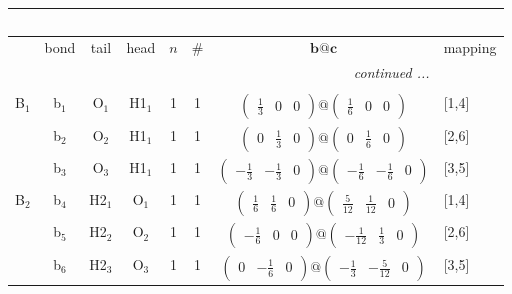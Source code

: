 \documentclass[fleqn,10pt,landscape]{article}
\begin{document}
\begin{itemize}
\begin{center}
\begin{longtable}{cc|cc|c|c|c|l}
\multicolumn{7}{l}{\tablename\ \thetable{}} \\
 \hline \hline
 & bond & tail & head & $n$ & \# & $\bm{b}@\bm{c}$ & mapping \\ \hline \endhead

 \hline \hline
\multicolumn{7}{r}{\footnotesize\it continued ...} \\ \endfoot

 \hline \hline
\multicolumn{7}{r}{} \\ \endlastfoot

B$_{1}$ & b$_{1}$ & O$_{1}$ & H1$_{1}$ & 1 & 1 & $\begin{pmatrix} \frac{1}{3} & 0 & 0 \end{pmatrix}@\begin{pmatrix} \frac{1}{6} & 0 & 0 \end{pmatrix}$ & [1,4] \\
& b$_{2}$ & O$_{2}$ & H1$_{1}$ & 1 & 1 & $\begin{pmatrix} 0 & \frac{1}{3} & 0 \end{pmatrix}@\begin{pmatrix} 0 & \frac{1}{6} & 0 \end{pmatrix}$ & [2,6] \\
& b$_{3}$ & O$_{3}$ & H1$_{1}$ & 1 & 1 & $\begin{pmatrix} - \frac{1}{3} & - \frac{1}{3} & 0 \end{pmatrix}@\begin{pmatrix} - \frac{1}{6} & - \frac{1}{6} & 0 \end{pmatrix}$ & [3,5] \\ \hline
B$_{2}$ & b$_{4}$ & H2$_{1}$ & O$_{1}$ & 1 & 1 & $\begin{pmatrix} \frac{1}{6} & \frac{1}{6} & 0 \end{pmatrix}@\begin{pmatrix} \frac{5}{12} & \frac{1}{12} & 0 \end{pmatrix}$ & [1,4] \\
& b$_{5}$ & H2$_{2}$ & O$_{2}$ & 1 & 1 & $\begin{pmatrix} - \frac{1}{6} & 0 & 0 \end{pmatrix}@\begin{pmatrix} - \frac{1}{12} & \frac{1}{3} & 0 \end{pmatrix}$ & [2,6] \\
& b$_{6}$ & H2$_{3}$ & O$_{3}$ & 1 & 1 & $\begin{pmatrix} 0 & - \frac{1}{6} & 0 \end{pmatrix}@\begin{pmatrix} - \frac{1}{3} & - \frac{5}{12} & 0 \end{pmatrix}$ & [3,5] \\
\end{longtable}
\end{center}


\end{itemize}
\end{document}
